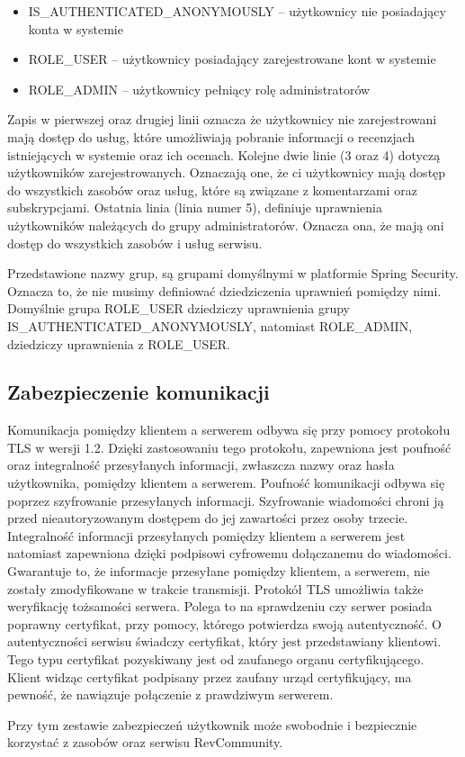 \begin{itemize}
\item IS\_AUTHENTICATED\_ANONYMOUSLY – użytkownicy nie posiadający konta w systemie
\item ROLE\_USER – użytkownicy posiadający zarejestrowane kont w systemie
\item ROLE\_ADMIN – użytkownicy pełniący rolę administratorów
\end{itemize}

 Zapis w pierwszej oraz drugiej linii oznacza że użytkownicy nie zarejestrowani mają dostęp do usług, które umożliwiają pobranie informacji o recenzjach istniejących w systemie oraz ich ocenach.
Kolejne dwie linie (3 oraz 4) dotyczą użytkowników zarejestrowanych. Oznaczają one, że ci użytkownicy mają dostęp do wszystkich zasobów oraz usług, które są związane z komentarzami oraz subskrypcjami.
Ostatnia linia (linia numer 5), definiuje uprawnienia użytkowników należących do grupy administratorów. Oznacza ona, że mają oni dostęp do wszystkich zasobów i usług serwisu.

Przedstawione nazwy grup, są grupami domyślnymi w platformie Spring Security. Oznacza to, że nie musimy definiować dziedziczenia uprawnień pomiędzy nimi. Domyślnie grupa ROLE\_USER dziedziczy uprawnienia grupy \newline IS\_AUTHENTICATED\_ANONYMOUSLY, natomiast ROLE\_ADMIN, dziedziczy uprawnienia z ROLE\_USER.

\subsection{Zabezpieczenie komunikacji}

Komunikacja pomiędzy klientem a serwerem odbywa się przy pomocy protokołu TLS w wersji 1.2. Dzięki zastosowaniu tego protokołu, zapewniona jest poufność oraz integralność przesyłanych informacji, zwłaszcza nazwy oraz hasła użytkownika, pomiędzy klientem a serwerem. Poufność komunikacji odbywa się poprzez szyfrowanie przesyłanych informacji. Szyfrowanie wiadomości chroni ją przed nieautoryzowanym dostępem do jej zawartości przez osoby trzecie.
Integralność informacji przesyłanych pomiędzy klientem a serwerem jest natomiast zapewniona dzięki podpisowi cyfrowemu dołączanemu do wiadomości. Gwarantuje to, że informacje przesyłane pomiędzy klientem, a serwerem, nie zostały zmodyfikowane w trakcie transmisji.
 Protokół TLS umożliwia także weryfikację tożsamości serwera. Polega to na sprawdzeniu czy serwer posiada poprawny certyfikat, przy pomocy, którego potwierdza swoją autentyczność. O autentyczności serwisu świadczy certyfikat, który jest przedstawiany klientowi. Tego typu certyfikat pozyskiwany jest od zaufanego organu certyfikującego. Klient widząc certyfikat podpisany przez zaufany urząd certyfikujący, ma pewność, że nawiązuje połączenie z prawdziwym serwerem.
 
Przy tym zestawie zabezpieczeń użytkownik może swobodnie i bezpiecznie korzystać z zasobów oraz serwisu RevCommunity.
